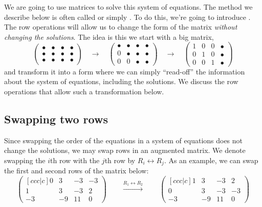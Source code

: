 \documentclass{ximera}
\begin{document}
We are going to use matrices to solve this system of equations. The
method we describe below is often called 
or simply . To do this, we're going to introduce
. The row operations will allow us to change the
form of the matrix \emph{without changing the solutions}. The idea is
this we start with a big matrix,
\[
  \begin{pmatrix}
    \bullet & \bullet & \bullet & \bullet \\
    \bullet & \bullet & \bullet & \bullet \\
    \bullet & \bullet & \bullet & \bullet
  \end{pmatrix}
  \quad \longrightarrow \quad
  \begin{pmatrix}
    \bullet & \bullet & \bullet & \bullet \\
    0 & \bullet & \bullet & \bullet \\
    0 & 0 & \bullet & \bullet
  \end{pmatrix}
  \quad \longrightarrow \quad
  \begin{pmatrix}
    1 & 0 & 0 & \bullet \\
    0 & 1 & 0 & \bullet \\
    0 & 0 & 1 & \bullet
  \end{pmatrix}
\]
and transform it into a form where we can simply ``read-off'' the
information about the system of equations, including the solutions.  We
discuss the row operations that allow such a transformation below.



\subsection{Swapping two rows}

Since swapping the order of the equations in a
system of equations does not change the solutions, we may swap rows
in an augmented matrix. We denote swapping the $i$th row with the
$j$th row by $R_i\leftrightarrow R_j$. As an example, we can swap
the first and second rows of the matrix below:
 \[
\begin{pmatrix}[ccc|c]
  0 &   3 & -3 & -3 \\
  1 &   3 & -3 & 2  \\
  -3& -9  & 11 & 0
\end{pmatrix}
\qquad
\xrightarrow{R_1 \leftrightarrow R_2}
\qquad
\begin{pmatrix}[ccc|c]
  1 &   3 & -3 & 2  \\
  0 &   3 & -3 & -3 \\
  -3& -9  & 11 & 0
\end{pmatrix}
\]
\end{document}
